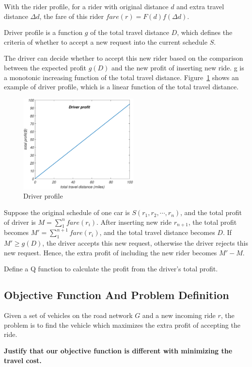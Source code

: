 With the rider profile, for a rider with original distance $d$ and extra travel distance $\Delta d$, the fare of this rider $fare(r) = F(d) f(\Delta d)$.

\begin{definition}
	Driver profile is a function $g$ of the total travel distance $D$, which defines the criteria of whether to accept a new request into the current schedule $S$.
\end{definition}


The driver can decide whether to accept this new rider based on the comparison between the expected profit $g(D)$ and the new profit of inserting new ride. g is a monotonic increasing function of the total travel distance. Figure~\ref{fig:driver_profile} shows an example of driver profile, which is a linear function of the total travel distance.

\begin{figure}[!ht]
	\centering
	\includegraphics[width = 60mm]{fig/driver.eps}
	\vspace{-0mm}\caption{Driver profile} \vspace{-2mm} \label{fig:driver_profile}
\end{figure}\vspace{-0mm}
 

Suppose the original schedule of one car is $S(r_1, r_2, \cdots, r_n)$, and the total profit of driver is $M=\sum_{1}^{n}fare(r_i)$. After inserting new ride $r_{n+1}$, the total profit becomes $M'=\sum_{1}^{n+1}fare(r_i)$, and the total travel distance becomes $D$. If $M' \geq g(D)$, the driver accepts this new request, otherwise the driver rejects this new request. Hence, the extra profit of including the new rider becomes $M'-M$.

\begin{definition}
Define a Q function to calculate the profit from the driver's total profit.
\end{definition}

\subsection{Objective Function And Problem Definition}
Given a set of vehicles on the road network $G$ and a new incoming ride $r$, the problem is to find the vehicle which maximizes the extra profit of accepting the ride.

\textbf{Justify that our objective function is different with minimizing the travel cost.}




